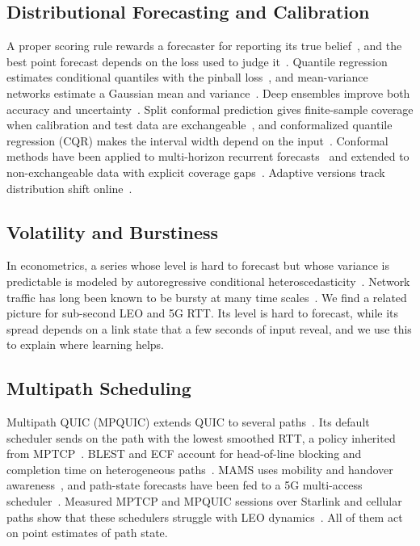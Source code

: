 \subsection{Distributional Forecasting and Calibration}
A proper scoring rule rewards a forecaster for reporting its true belief~\cite{gneiting2007strictly}, and the best point forecast depends on the loss used to judge it~\cite{gneiting2011making}. Quantile regression estimates conditional quantiles with the pinball loss~\cite{koenker1978regression}, and mean-variance networks estimate a Gaussian mean and variance~\cite{nix1994estimating}. Deep ensembles improve both accuracy and uncertainty~\cite{lakshminarayanan2017simple}. Split conformal prediction gives finite-sample coverage when calibration and test data are exchangeable~\cite{lei2018distribution}, and conformalized quantile regression (CQR) makes the interval width depend on the input~\cite{romano2019conformalized}. Conformal methods have been applied to multi-horizon recurrent forecasts~\cite{stankeviciute2021conformal} and extended to non-exchangeable data with explicit coverage gaps~\cite{barber2023conformal}. Adaptive versions track distribution shift online~\cite{gibbs2021adaptive}.

\subsection{Volatility and Burstiness}
In econometrics, a series whose level is hard to forecast but whose variance is predictable is modeled by autoregressive conditional heteroscedasticity~\cite{engle1982autoregressive}. Network traffic has long been known to be bursty at many time scales~\cite{paxson1995wide}. We find a related picture for sub-second LEO and 5G RTT. Its level is hard to forecast, while its spread depends on a link state that a few seconds of input reveal, and we use this to explain where learning helps.

\subsection{Multipath Scheduling}
Multipath QUIC (MPQUIC) extends QUIC to several paths~\cite{deconinck2017multipath}. Its default scheduler sends on the path with the lowest smoothed RTT, a policy inherited from MPTCP~\cite{paasch2014experimental}. BLEST and ECF account for head-of-line blocking and completion time on heterogeneous paths~\cite{ferlin2016blest,lim2017ecf}. MAMS uses mobility and handover awareness~\cite{yang2024mams}, and path-state forecasts have been fed to a 5G multi-access scheduler~\cite{maglione2025intelligent}. Measured MPTCP and MPQUIC sessions over Starlink and cellular paths show that these schedulers struggle with LEO dynamics~\cite{baltaci2023multipath}. All of them act on point estimates of path state.

